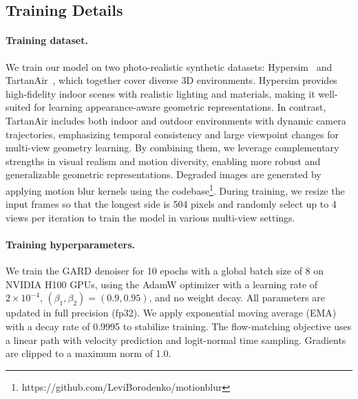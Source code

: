\documentclass{llmxive}
\begin{document}
\subsection{Training Details}

\paragraph{Training dataset.}
We train our model on two photo-realistic synthetic datasets: Hypersim~\cite{roberts2021hypersim} and TartanAir~\cite{wang2020tartanair}, which together cover diverse 3D environments. Hypersim provides high-fidelity indoor scenes with realistic lighting and materials, making it well-suited for learning appearance-aware geometric representations. In contrast, TartanAir includes both indoor and outdoor environments with dynamic camera trajectories, emphasizing temporal consistency and large viewpoint changes for multi-view geometry learning. By combining them, we leverage complementary strengths in visual realism and motion diversity, enabling more robust and generalizable geometric representations. Degraded images are generated by applying motion blur kernels using the codebase\footnote{https://github.com/LeviBorodenko/motionblur}. During training, we resize the input frames so that the longest side is 504 pixels and randomly select up to 4 views per iteration to train the model in various multi-view settings. 

\paragraph{Training hyperparameters.}
We train the GARD denoiser for 10 epochs with a global batch size of 8 on NVIDIA H100 GPUs, using the AdamW optimizer with a learning rate of $2 \times 10^{-4}$, $(\beta_1, \beta_2) = (0.9, 0.95)$, and no weight decay. All parameters are updated in full precision (fp32). We apply exponential moving average (EMA) with a decay rate of 0.9995 to stabilize training. The flow-matching objective uses a linear path with velocity prediction and logit-normal time sampling. Gradients are clipped to a maximum norm of 1.0.
\end{document}
